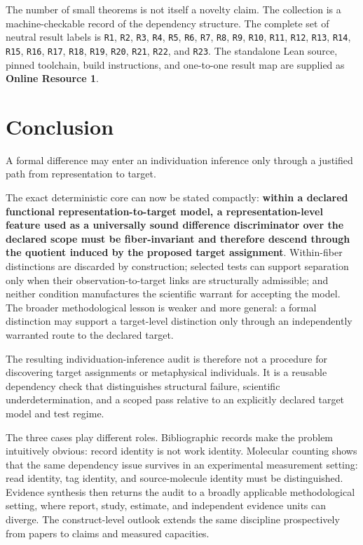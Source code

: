 \documentclass[11pt]{article}
\begin{document}
The number of small theorems is not itself a novelty claim. The collection is a machine-checkable record of the dependency structure. The complete set of neutral result labels is \texttt{R1}, \texttt{R2}, \texttt{R3}, \texttt{R4}, \texttt{R5}, \texttt{R6}, \texttt{R7}, \texttt{R8}, \texttt{R9}, \texttt{R10}, \texttt{R11}, \texttt{R12}, \texttt{R13}, \texttt{R14}, \texttt{R15}, \texttt{R16}, \texttt{R17}, \texttt{R18}, \texttt{R19}, \texttt{R20}, \texttt{R21}, \texttt{R22}, and \texttt{R23}. The standalone Lean source, pinned toolchain, build instructions, and one-to-one result map are supplied as \textbf{Online Resource 1}.

\section{Conclusion}

A formal difference may enter an individuation inference only through a justified path from representation to target.

The exact deterministic core can now be stated compactly: \textbf{within a declared functional representation-to-target model, a representation-level feature used as a universally sound difference discriminator over the declared scope must be fiber-invariant and therefore descend through the quotient induced by the proposed target assignment}. Within-fiber distinctions are discarded by construction; selected tests can support separation only when their observation-to-target links are structurally admissible; and neither condition manufactures the scientific warrant for accepting the model. The broader methodological lesson is weaker and more general: a formal distinction may support a target-level distinction only through an independently warranted route to the declared target.

The resulting individuation-inference audit is therefore not a procedure for discovering target assignments or metaphysical individuals. It is a reusable dependency check that distinguishes structural failure, scientific underdetermination, and a scoped pass relative to an explicitly declared target model and test regime.

The three cases play different roles. Bibliographic records make the problem intuitively obvious: record identity is not work identity. Molecular counting shows that the same dependency issue survives in an experimental measurement setting: read identity, tag identity, and source-molecule identity must be distinguished. Evidence synthesis then returns the audit to a broadly applicable methodological setting, where report, study, estimate, and independent evidence units can diverge. The construct-level outlook extends the same discipline prospectively from papers to claims and measured capacities.
\end{document}
